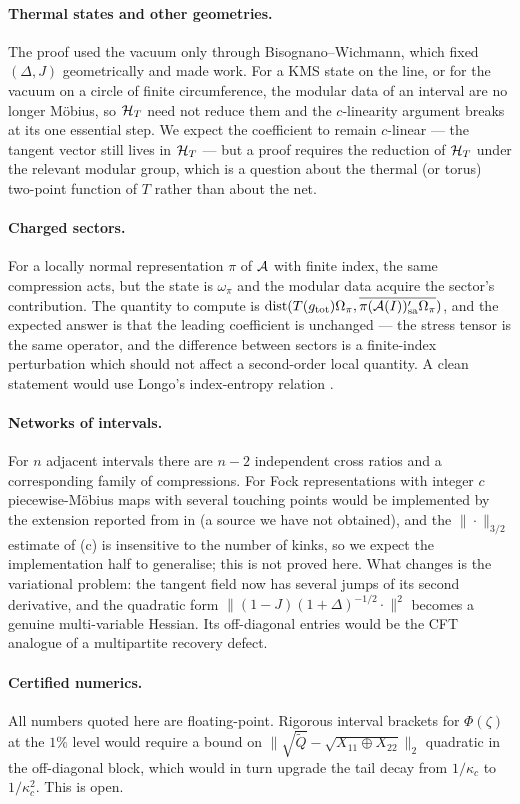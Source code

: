 \paragraph{Thermal states and other geometries.}  The proof used the vacuum only through
Bisognano--Wichmann, which fixed $(\Delta,J)$ geometrically and made  work.  For a KMS
state on the line, or for the vacuum on a circle of finite circumference, the modular data of an interval
are no longer M\"obius, so $\mathcal H_T$ need not reduce them and the $c$-linearity argument breaks at its one
essential step.  We expect the coefficient to remain $c$-linear --- the tangent vector still lives in $\mathcal H_T$
--- but a proof requires the reduction of $\mathcal H_T$ under the relevant modular group, which is a question about
the thermal (or torus) two-point function of $T$ rather than about the net.

\paragraph{Charged sectors.}  For a locally normal representation $\pi$ of $\mathcal A$ with finite index, the same
compression acts, but the state is $\omega_{\pi}$ and the modular data acquire the sector's contribution.
The quantity to compute is $\operatorname{dist}(T(g_{\rm tot})\Omega_{\pi},\overline{\pi(\mathcal A(I))'_{\rm sa}\Omega_{\pi}})$,
and the expected answer is that the leading coefficient is unchanged --- the stress tensor is the same
operator, and the difference between sectors is a finite-index perturbation which should not affect a
second-order local quantity.  A clean statement would use Longo's index-entropy relation \cite{LX}.

\paragraph{Networks of intervals.}  For $n$ adjacent intervals there are $n-2$ independent cross ratios and
a corresponding family of compressions.  For Fock representations with integer $c$ piecewise-M\"obius maps
with several touching points would be implemented by the extension reported from \cite{DIT} in
 (a source we have not obtained), and the $\|\cdot\|_{3/2}$ estimate of (c) is
insensitive to the number of kinks, so we expect the implementation half to generalise; this is not proved
here.  What changes is the variational problem: the tangent field now has several jumps of its second
derivative, and the quadratic form $\|(1-J)(1+\Delta)^{-1/2}\cdot\|^{2}$ becomes a genuine multi-variable
Hessian.  Its off-diagonal entries would be the CFT analogue of a multipartite recovery defect.

\paragraph{Certified numerics.}  All numbers quoted here are floating-point.  Rigorous interval brackets for
$\Phi(\zeta)$ at the $1\%$ level would require a bound on
$\|\sqrt{\tilde Q}-\sqrt{X_{11}\oplus X_{22}}\|_{2}$ quadratic in the off-diagonal block, which would in
turn upgrade the tail decay from $1/\kappa_{c}$ to $1/\kappa_{c}^{2}$.  This is open.

